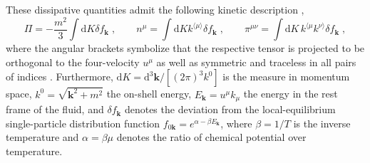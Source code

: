\documentclass[a4paper, amsfonts, amssymb, amsmath, reprint, showkeys, nofootinbib, twoside, onecolumn,notitlepage]{revtex4-2}
\renewcommand{\d}{\mathrm{d}}
\renewcommand{\k}{\mathbf{k}}
\begin{document}
These dissipative quantities admit the following kinetic description \cite{Denicol2012Boltzmann},
\begin{equation}
    \Pi=-\frac{m^2}{3} \int \d K \delta f_\k\;,\qquad n^\mu = \int \d K k^{\langle\mu\rangle}\delta f_\k\;,\qquad\pi^{\mu\nu}= \int \d K \, k^{\langle\mu} k^{\nu\rangle} \delta f_\k \;,
\end{equation}
where the angular brackets symbolize that the respective tensor is projected to be orthogonal to the four-velocity $u^\mu$ as well as symmetric and traceless in all pairs of indices \cite{Denicol2012Boltzmann}.
Furthermore, $\d K = \d^3 \k /[(2\pi)^3 k^0]$ is the measure in momentum space, $k^0=\sqrt{\k^2+m^2}$ the on-shell energy, $E_\k=u^\mu k_\mu$ the energy in the rest frame of the fluid, and $\delta f_\k$ denotes the deviation from the local-equilibrium single-particle distribution function $f_{0\k}=e^{\alpha-\beta E_\k}$, where $\beta=1/T$ is the inverse temperature and  $\alpha=\beta \mu$ denotes the ratio of chemical potential over temperature.
\end{document}
